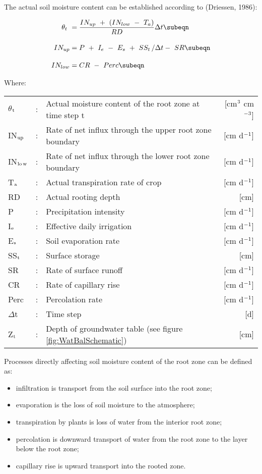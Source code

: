 The actual soil moisture content can be established according to (Driessen, 1986):

\begin{align}
\label{eq:6.1}
\theta_{t~} &= {\frac{IN _{up} ~+~(IN _{low} ~-~T _{a} )}{RD}} \Delta t \subeqn \\[1em]
IN_{up} &= P~+~I _{e} ~-~E _{s} ~+~SS _{t} \, /\Delta t-~SR  \subeqn  \\[1em]
IN_{low} &= CR~-~Perc \subeqn
\end{align}

Where:\\[5pt]
\begin{tabularx}{\textwidth}{llXr}
$\theta$$_{{\rm t}}$ &:& Actual moisture content of the root zone at time step t
   & [cm$^{{\rm 3}}$ cm$^{{\rm -3}}$]\\
IN$_{{\rm up}}$ &:& Rate of net influx through the upper root zone boundary
   & [cm d$^{{\rm -1}}$]\\
IN$_{{\rm lo}}$$_{{\rm w}}$ &:& Rate of net influx through the lower root zone boundary
   & [cm d$^{{\rm -1}}$]\\
T$_{{\rm a}}$ &:& Actual transpiration rate of crop
   & [cm d$^{{\rm -1}}$]\\
RD &:& Actual rooting depth  & [cm]\\
P &:& Precipitation intensity  & [cm d$^{{\rm -1}}$]\\
I$_{{\rm e}}$ &:& Effective daily irrigation  & [cm d$^{{\rm -1}}$]\\
E$_{{\rm s}}$ &:& Soil evaporation rate   & [cm d$^{{\rm -1}}$]\\
SS$_{{\rm t}}$ &:& Surface storage  & [cm]\\
SR &:& Rate of surface runoff  & [cm d$^{{\rm -1}}$]\\
CR &:& Rate of capillary rise  & [cm d$^{{\rm -1}}$]\\
Perc &:& Percolation rate  & [cm d$^{{\rm -1}}$]\\
$\Delta$t &:& Time step  & [d]\\
Z$_{{\rm t}}$ &:& Depth of groundwater table (see figure \ref{fig:WatBalSchematic})  & [cm]\\
\end{tabularx}

Processes directly affecting soil moisture content of the root zone can be defined as:
\begin{itemize}
\item infiltration is transport from the soil surface into the root zone;
\item evaporation is the loss of soil moisture to the atmosphere;
\item transpiration by plants is loss of water from the interior root zone;
\item percolation is downward transport of water from the root zone to the layer below the root zone;
\item capillary rise is upward transport into the rooted zone.
\end{itemize}

